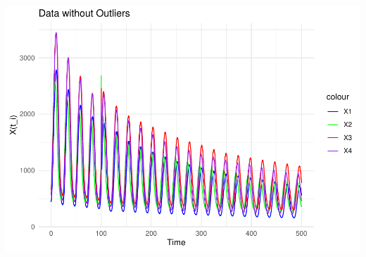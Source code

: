 \documentclass[
]{article}
\begin{document}
\includegraphics{CircadianProjectForMcManus_files/figure-latex/unnamed-chunk-2-1.pdf}
\end{document}
